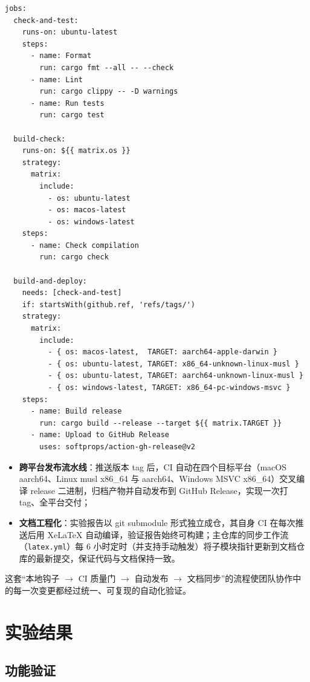 \documentclass{SYSUReport}
\begin{document}
\begin{lstlisting}[language={},caption={CI 工作流（.github/workflows/rust.yml 节选）}]
jobs:
  check-and-test:
    runs-on: ubuntu-latest
    steps:
      - name: Format
        run: cargo fmt --all -- --check
      - name: Lint
        run: cargo clippy -- -D warnings
      - name: Run tests
        run: cargo test

  build-check:
    runs-on: ${{ matrix.os }}
    strategy:
      matrix:
        include:
          - os: ubuntu-latest
          - os: macos-latest
          - os: windows-latest
    steps:
      - name: Check compilation
        run: cargo check

  build-and-deploy:
    needs: [check-and-test]
    if: startsWith(github.ref, 'refs/tags/')
    strategy:
      matrix:
        include:
          - { os: macos-latest,  TARGET: aarch64-apple-darwin }
          - { os: ubuntu-latest, TARGET: x86_64-unknown-linux-musl }
          - { os: ubuntu-latest, TARGET: aarch64-unknown-linux-musl }
          - { os: windows-latest, TARGET: x86_64-pc-windows-msvc }
    steps:
      - name: Build release
        run: cargo build --release --target ${{ matrix.TARGET }}
      - name: Upload to GitHub Release
        uses: softprops/action-gh-release@v2
\end{lstlisting}

\begin{itemize}
    \item \textbf{跨平台发布流水线}：推送版本 tag 后，CI 自动在四个目标平台（macOS aarch64、Linux musl x86\_64 与 aarch64、Windows MSVC x86\_64）交叉编译 release 二进制，归档产物并自动发布到 GitHub Release，实现一次打 tag、全平台交付；
    \item \textbf{文档工程化}：实验报告以 git submodule 形式独立成仓，其自身 CI 在每次推送后用 XeLaTeX 自动编译，验证报告始终可构建；主仓库的同步工作流（\texttt{latex.yml}）每 6 小时定时（并支持手动触发）将子模块指针更新到文档仓库的最新提交，保证代码与文档保持一致。
\end{itemize}

这套``本地钩子 $\rightarrow$ CI 质量门 $\rightarrow$ 自动发布 $\rightarrow$ 文档同步''的流程使团队协作中的每一次变更都经过统一、可复现的自动化验证。

\section{实验结果}

\subsection{功能验证}
\end{document}
